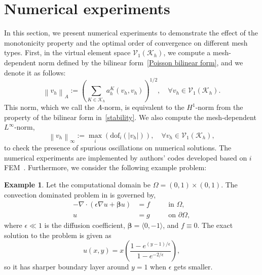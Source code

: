 \documentclass[a4paper]{article}
\theoremstyle{plain}
\theoremstyle{definition}
\newtheorem{example}[theorem]{Example}
\numberwithin{equation}{section}
\begin{document}
\section{Numerical experiments}
\label{sec: numerical}
In this section, we present numerical experiments to demonstrate the effect of the monotonicity property and the optimal order of convergence on different mesh types.
First, in the virtual element space $\mathcal V_1(\mathcal{K}_h)$, we compute a mesh-dependent norm defined by 
the bilinear form~\eqref{Poisson bilinear form}, and we denote it as follows:
\begin{equation}
\left\|v_h\right\|_A:=\left(\sum_{K\in\mathcal{K}_h}a_h^K(v_h,v_h)\right)^{1/2},\quad\forall v_h\in \mathcal V_1(\mathcal{K}_h).\label{eqn: A-norm}
\end{equation}
This norm, which we call the $A$-norm, is equivalent to the $H^1$-norm from the property of the bilinear form in~\eqref{stability}. 
We also compute the mesh-dependent $L^\infty$-norm,
\begin{equation*}
\left\|v_h\right\|_{\infty }:=\max_{i}\left(\text{dof}_i(|v_h|)\right),\quad\forall v_h\in \mathcal V_1(\mathcal{K}_h),
\end{equation*}
to check the presence of spurious oscillations on numerical solutions.
The numerical experiments are implemented by authors' codes developed based on $i$FEM~\cite{CHE09}.
Furthermore, we consider the following example problem:
\begin{example}
Let the computational domain be $\Omega=(0,1)\times(0,1)$. The convection dominated problem in \cite{ELM05} is governed by,
\begin{subequations}\label{sys: example1}
\begin{alignat}{2}
-\nabla\cdot\left(\epsilon \nabla u+\bm{\beta}u\right)& =f && \quad \text{in } \Omega, \label{eqn: example1} \\
u &= g && \quad \text{on } \partial\Omega,  \label{eqn: bdexample1}
\end{alignat}
\end{subequations}
where $\epsilon\ll1$ is the diffusion coefficient, $\bm{\beta}=\langle 0,-1\rangle$, and $f\equiv0$.
The exact solution to the problem is given as
\begin{equation}
u(x,y)=x\left(\frac{1-e^{(y-1)/\epsilon}}{1-e^{-2/\epsilon}}\right),\label{eqn: example_exact}
\end{equation}
so it has sharper boundary layer around $y=1$ when $\epsilon$ gets smaller.
\label{ex1}
\end{example}
\end{document}
